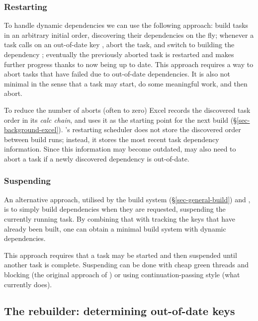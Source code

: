 \vspace{-2mm}
\subsubsection{Restarting}\label{sec-restarting}

To handle dynamic dependencies we can use the following approach:
build tasks in an arbitrary initial order, discovering their dependencies on the fly;
whenever a task calls  on an out-of-date key , abort the task,
and switch to building the dependency ; eventually the previously
aborted task is restarted and makes further progress thanks to  now
being up to date.
This approach requires a way to abort tasks that have failed due to out-of-date
dependencies. It is also not minimal in the sense that a task may start, do some
meaningful work, and then abort.

To reduce the number of aborts (often to zero) Excel records the
discovered task order in its \emph{calc chain}, and uses it as the
starting point for the next build (\S\ref{sec-background-excel}).
\Bazel's restarting scheduler does not store the discovered order
between build runs; instead, it stores the most recent task dependency
information. Since this information may become outdated, \Bazel may
also need to abort a task if a newly discovered dependency is
out-of-date.

\vspace{-2mm}
\subsubsection{Suspending}\label{sec-suspending}

An alternative approach, utilised by the  build system
(\S\ref{sec-general-build}) and \Shake, is to simply build dependencies when
they are requested, suspending the currently running task. By combining that
with tracking the keys that have already been built, one can obtain a minimal
build system with dynamic dependencies.

This approach requires that a task may be started and then suspended until
another task is complete. Suspending can be done with cheap green threads and blocking
(the original approach of \Shake) or using continuation-passing style \citep{claessen_continuations} (what
\Shake currently does).

\subsection{The rebuilder: determining out-of-date keys} \label{sec-out-of-date}


